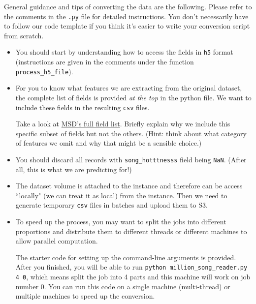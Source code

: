 General guidance and tips of converting the data are the following. Please refer to the comments in the \texttt{.py} file for detailed instructions. You don't necessarily have to follow our code template if you think it's easier to write your conversion script from scratch.
\begin{itemize}
    \item You should start by understanding how to access the fields in \texttt{h5} format (instructions are given in the comments under the function \texttt{process\_h5\_file}). 
    \item For you to know what features we are extracting from the original dataset, the complete list of fields is provided \textit{at the top} in the python file. We want to include these fields in the resulting \texttt{csv} files.
    
    Take a look at \href{http://millionsongdataset.com/pages/field-list/}{MSD's full field list}. Briefly explain why we include this specific subset of fields but not the others.  (Hint: think about what category of features we omit and why that might be a sensible choice.)
    
    \begin{tcolorbox}[fit,height=5cm, blank, borderline={1pt}{-2pt},nobeforeafter]
    \end{tcolorbox}
    
    \item You should discard all records with \texttt{song\_hotttnesss} field being \texttt{NaN}. (After all, this is what we are predicting for!)
    
    \item The dataset volume is attached to the instance and therefore can be access ``locally" (we can treat it as local) from the instance. Then we need to generate temporary \texttt{csv} files in batches and upload them to S3. 
    
    
    \item To speed up the process, you may want to split the jobs into different proportions and distribute them to different threads or different machines to allow parallel computation. 
    
    The starter code for setting up the command-line arguments is provided. After you finished, you will be able to run \texttt{python million\_song\_reader.py 4 0}, which means split the job into 4 parts and this machine will work on job number 0. You can run this code on a single machine (multi-thread) or multiple machines to speed up the conversion.
    

\end{itemize}
